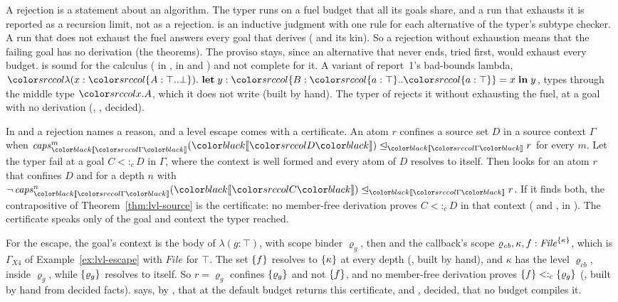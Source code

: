 A rejection is a statement about an algorithm. The typer runs on a fuel budget that all its goals share, and a run that exhausts it is reported as a recursion limit, not as a rejection.  is an inductive judgment with one rule for each alternative of the typer's subtype checker. A run that does not exhaust the fuel answers every goal that  derives ( and its kin). So a rejection without exhaustion means that the failing goal has no  derivation (the  theorems). The proviso stays, since an alternative that never ends, tried first, would exhaust every budget.  is sound for the calculus ( in \treeK,  in \treeCC and \treeCL) and not complete for it. A variant of report~1's bad-bounds lambda, $\src{\lambda(x : \dtyp{A}{\top}{\bot}).\ \klet y : \dtyp{B}{\dfld{a}{\top}}{\dfld{a}{\top}} = x \kin y}$, types through the middle type $\src{x.A}$, which it does not write (built by hand). The typer of \treeK rejects it without exhausting the fuel, at a goal with no  derivation (, , decided).

In \treeCC and \treeCL a rejection names a reason, and a level escape comes with a certificate. An atom $r$ confines a source set $D$ in a source context $\Gamma$ when $\lvlle{\trans{\Gamma}}{\capsr{\trans{\Gamma}}{m}{\trans{D}}}{r}$ for every $m$. Let the typer fail at a goal $C <:_{c} D$ in $\Gamma$, where the context is well formed and every atom of $D$ resolves to itself. Then  looks for an atom $r$ that confines $D$ and for a depth $n$ with $\neg\,\lvlle{\trans{\Gamma}}{\capsr{\trans{\Gamma}}{n}{\trans{C}}}{r}$. If it finds both, the contrapositive of Theorem~\ref{thm:lvl-source} is the certificate: no member-free derivation proves $C <:_{c} D$ in that context ( and , in \treeCC). The certificate speaks only of the goal and context the typer reached.

For the escape, the goal's context is the body of $\lambda(g : \top)$, with scope binder $\varrho_g$, then  and the callback's scope $\varrho_{\mathit{cb}}, \kappa, f : \mathit{File}^{\{\kappa\}}$, which is $\Gamma_{\!X4}$ of Example~\ref{ex:lvl-escape} with $\mathit{File}$ for $\top$. The set $\{f\}$ resolves to $\{\kappa\}$ at every depth (, built by hand), and $\kappa$ has the level $\varrho_{\mathit{cb}}$, inside $\varrho_g$, while $\{\varrho_g\}$ resolves to itself. So $r = \varrho_g$ confines $\{\varrho_g\}$ and not $\{f\}$, and no member-free derivation proves $\{f\} <:_{c} \{\varrho_g\}$ (, built by hand from decided facts).  says, by , that  at the default budget returns this certificate, and , decided, that no budget compiles it.

